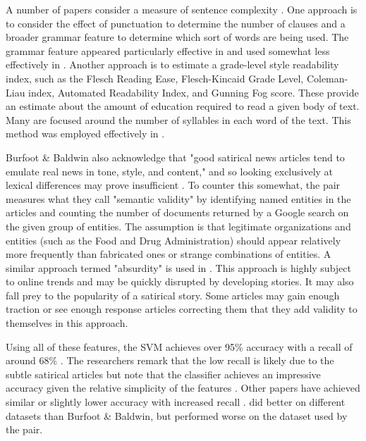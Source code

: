 \documentclass [12 pt] {report}
\begin{document}
A number of papers consider a measure of sentence complexity \cite{fakeNews} \cite{Yang}. One approach is to consider the effect of punctuation to determine the number of clauses and a broader grammar feature to determine which sort of words are being used. The grammar feature appeared particularly effective in \cite{fakeNews} and used somewhat less effectively in \cite{Twitter}. Another approach is to estimate a grade-level style readability index, such as the Flesch Reading Ease, Flesch-Kincaid Grade Level, Coleman-Liau index, Automated Readability Index, and Gunning Fog score. These provide an estimate about the amount of education required to read a given body of text. Many are focused around the number of syllables in each word of the text. This method was employed effectively in \cite{Yang}.
	
Burfoot \& Baldwin also acknowledge that "good satirical news articles tend to emulate real news in tone, style, and content," and so looking exclusively at lexical differences may prove insufficient \cite{Burfoot}. To counter this somewhat, the pair measures what they call "semantic validity" by identifying named entities in the articles and counting the number of documents returned by a Google search on the given group of entities. The assumption is that legitimate organizations and entities (such as the Food and Drug Administration) should appear relatively more frequently than fabricated ones or strange combinations of entities\cite{Burfoot}. A similar approach termed "absurdity" is used in \cite{fakeNews}. This approach is highly subject to online trends and may be quickly disrupted by developing stories. It may also fall prey to the popularity of a satirical story. Some articles may gain enough traction or see enough response articles correcting them that they add validity to themselves in this approach. 
	
Using all of these features, the SVM achieves over 95\% accuracy with a recall of around 68\% \cite{Burfoot}. The researchers remark that the low recall is likely due to the subtle satirical articles but note that the classifier achieves an impressive accuracy given the relative simplicity of the features \cite{Burfoot}. Other papers have achieved similar or slightly lower accuracy with increased recall \cite{Ahmad} \cite{fakeNews}. \cite{Mining} did better on different datasets than Burfoot \& Baldwin, but performed worse on the dataset used by the pair.
	
\end{document}
